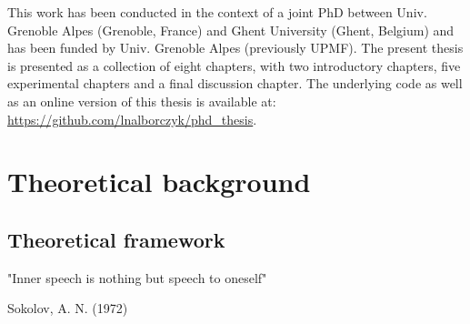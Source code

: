 \documentclass[a4paper,12pt,twoside,onecolumn,openright,final,oldfontcommands]{memoir}
\newcommand{\initial}[1]{
	\lettrine[lines=3,lhang=0.33,nindent=0em]{
		\color{gray}
     		{\textsc{#1}}}{}}
\newcommand{\clearemptydoublepage}{\newpage{\thispagestyle{empty}\cleardoublepage}}
\begin{document}
\initial{T}his work has been conducted in the context of a joint PhD between Univ. Grenoble Alpes (Grenoble, France) and Ghent University (Ghent, Belgium) and has been funded by Univ. Grenoble Alpes (previously UPMF). The present thesis is presented as a collection of eight chapters, with two introductory chapters, five experimental chapters and a final discussion chapter. The underlying code as well as an online version of this thesis is available at: \url{https://github.com/lnalborczyk/phd_thesis}.

\clearemptydoublepage

\renewcommand{\contentsname}{Table of contents}
\tableofcontents*
{}
\newpage

\listoftables
{}
\newpage

\listoffigures
{}
\newpage


\hypertarget{part-theoretical-background}{%
\part{Theoretical background}\label{part-theoretical-background}}

\sloppy 

\hypertarget{intro}{%
\chapter{Theoretical framework}\label{intro}}

\epigraph{"Inner speech is nothing but speech to oneself"}{Sokolov, A. N. (1972)}
\end{document}
